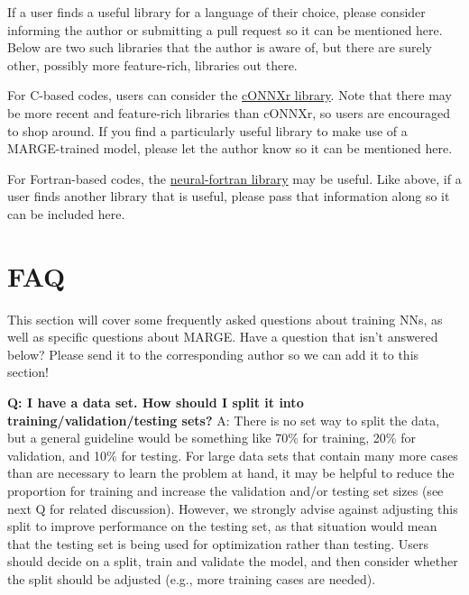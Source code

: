 \documentclass[letterpaper, 12pt]{article}
\begin{document}
\noindent If a user finds a useful library for a language of their choice, please 
consider informing the author or submitting a pull request so it can be 
mentioned here.  Below are two such libraries that the author is aware of, 
but there are surely other, possibly more feature-rich, libraries out there. \newline

\noindent For C-based codes, users can consider the 
\href{https://github.com/alrevuelta/cONNXr}{cONNXr library}.  Note that there 
may be more recent and feature-rich libraries than cONNXr, so users are 
encouraged to shop around.  If you find a particularly useful library to make 
use of a MARGE-trained model, please let the author know so it can be 
mentioned here. \newline

\noindent For Fortran-based codes, the 
\href{https://github.com/modern-fortran/neural-fortran}{neural-fortran library} 
may be useful.  Like above, if a user finds another library that is useful, 
please pass that information along so it can be included here.


\section{FAQ}

This section will cover some frequently asked questions about training NNs, 
as well as specific questions about MARGE.  Have a question that isn't 
answered below?  Please send it to the corresponding author so we can add 
it to this section! \newline

\noindent \textbf{Q: I have a data set.  How should I split it into 
training/validation/testing sets?}  A: There is no set way to split the data, 
but a general guideline would be something like 70\% for training, 20\% for 
validation, and 10\% for testing.  For large data sets that contain many more 
cases than are necessary to learn the problem at hand, it may be helpful to 
reduce the proportion for training and increase the validation and/or testing 
set sizes (see next Q for related discussion).  However, we strongly advise 
against adjusting this split to improve
performance on the testing set, as that situation would mean that the testing 
set is being used for optimization rather than testing.  Users should decide 
on a split, train and validate the model, and then consider whether the split 
should be adjusted (e.g., more training cases are needed).  \newline 
\end{document}

